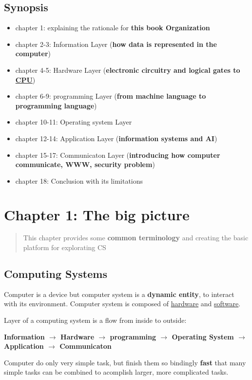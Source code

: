 \documentclass[12pt]{article}
\begin{document}
\subsection{Synopsis}
\begin{itemize}
    \item chapter 1: explaining the rationale for \textbf{this book Organization}
    \item chapter 2-3: Information Layer (\textbf{{how data is represented in the computer}})
    \item chapter 4-5: Hardware Layer (\textbf{electronic circuitry and logical gates to \underline{CPU}})
    \item chapter 6-9: programming Layer (\textbf{from machine language to programming language})     
    \item chapter 10-11: Operating system Layer
    \item chapter 12-14: Application Layer (\textbf{information systems and AI})
    \item chapter 15-17: Communicaton Layer (\textbf{introducing how computer communicate, WWW, security problem})
    \item chapter 18: Conclusion with its limitations 
\end{itemize}

\section{Chapter 1: The big picture}
\begin{abstract}
    This chapter provides some \textbf{common terminology} and creating the basic platform for explorating CS 
\end{abstract}

\subsection{Computing Systems}
Computer is a device but computer system is a \textbf{dynamic entity}, to interact with its environment.
Computer system is composed of \underline{hardware} and \underline{software}.

Layer of a computing system is a flow from inside to outside:
\begin{center}
    \textbf{Information $\rightarrow$ Hardware $\rightarrow$ programming $\rightarrow$ Operating System $\rightarrow$ Application $\rightarrow$ Communicaton}
\end{center}

Computer do only very simple task, but finish them so bindingly \textbf{fast}
that many simple tasks can be combined to acomplish larger, more complicated tasks.
\end{document}
